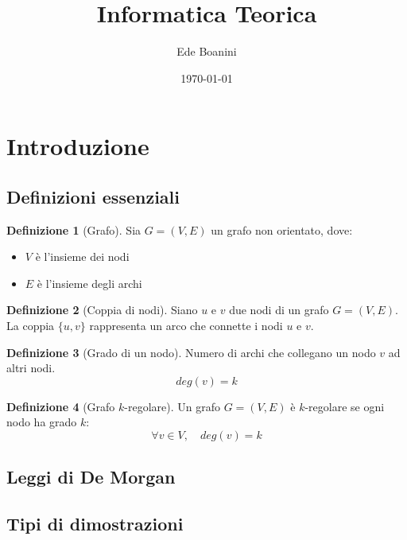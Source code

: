 \documentclass{article}  %
\title{Informatica Teorica}
\author{Ede Boanini}
\date{\today}
\theoremstyle{definition}
\newtheorem{definition}{Definizione}[section]
\begin{document}
\maketitle
\tableofcontents %
\newpage
\section{Introduzione}
\subsection{Definizioni essenziali}
\begin{definition}[Grafo]
	Sia \(G=(V,E)\) un grafo non orientato, dove:
	\begin{itemize}
		\item \(V\) è l'insieme dei nodi
		\item \(E\) è l'insieme degli archi
	\end{itemize}
\end{definition}
\begin{definition}[Coppia di nodi]
	Siano \(u\) e \(v\) due nodi di un grafo \(G = (V,E)\).
	La coppia \(\{u,v\}\) rappresenta un arco che connette i nodi \(u\) e \(v\).
\end{definition}
\begin{definition}[Grado di un nodo]
	Numero di archi che collegano un nodo $v$ ad altri nodi.
	\[
		deg(v)=k
	\]
\end{definition}
\begin{definition}[Grafo $k$-regolare]
	Un grafo \(G=(V,E)\) è $k$-regolare se ogni nodo ha grado $k$:
	\[
		\forall v \in V, \quad deg(v)=k
	\]
\end{definition}
\subsection{Leggi di De Morgan}
\subsection{Tipi di dimostrazioni}
\end{document}
